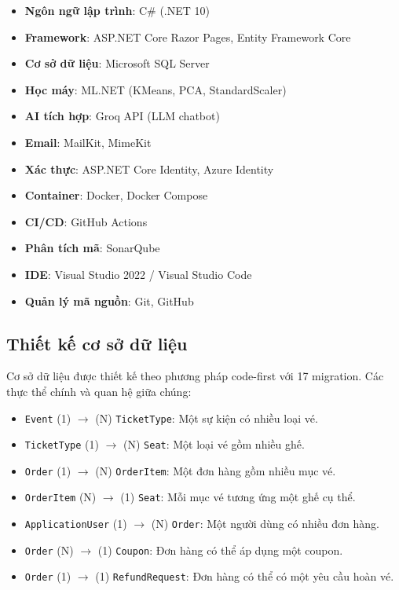 \documentclass[../main.tex]{subfiles}
\begin{document}
\begin{itemize}
    \item \textbf{Ngôn ngữ lập trình}: C\# (.NET 10)
    \item \textbf{Framework}: ASP.NET Core Razor Pages, Entity Framework Core
    \item \textbf{Cơ sở dữ liệu}: Microsoft SQL Server
    \item \textbf{Học máy}: ML.NET (KMeans, PCA, StandardScaler)
    \item \textbf{AI tích hợp}: Groq API (LLM chatbot)
    \item \textbf{Email}: MailKit, MimeKit
    \item \textbf{Xác thực}: ASP.NET Core Identity, Azure Identity
    \item \textbf{Container}: Docker, Docker Compose
    \item \textbf{CI/CD}: GitHub Actions
    \item \textbf{Phân tích mã}: SonarQube
    \item \textbf{IDE}: Visual Studio 2022 / Visual Studio Code
    \item \textbf{Quản lý mã nguồn}: Git, GitHub
\end{itemize}

\subsection{Thiết kế cơ sở dữ liệu}

Cơ sở dữ liệu được thiết kế theo phương pháp code-first với 17 migration. Các thực thể chính và quan hệ giữa chúng:

\begin{itemize}
    \item \texttt{Event} (1) $\rightarrow$ (N) \texttt{TicketType}: Một sự kiện có nhiều loại vé.
    \item \texttt{TicketType} (1) $\rightarrow$ (N) \texttt{Seat}: Một loại vé gồm nhiều ghế.
    \item \texttt{Order} (1) $\rightarrow$ (N) \texttt{OrderItem}: Một đơn hàng gồm nhiều mục vé.
    \item \texttt{OrderItem} (N) $\rightarrow$ (1) \texttt{Seat}: Mỗi mục vé tương ứng một ghế cụ thể.
    \item \texttt{ApplicationUser} (1) $\rightarrow$ (N) \texttt{Order}: Một người dùng có nhiều đơn hàng.
    \item \texttt{Order} (N) $\rightarrow$ (1) \texttt{Coupon}: Đơn hàng có thể áp dụng một coupon.
    \item \texttt{Order} (1) $\rightarrow$ (1) \texttt{RefundRequest}: Đơn hàng có thể có một yêu cầu hoàn vé.
\end{itemize}
\end{document}
